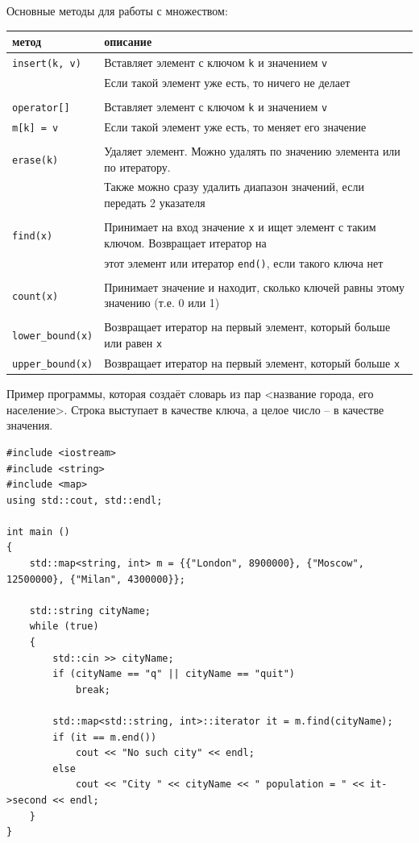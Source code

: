 \documentclass{article}
\begin{document}
Основные методы для работы с множеством:
\begin{center}
\begin{tabular}{ l | l }
 метод & описание \\ \hline
 \texttt{insert(k, v)}  & Вставляет элемент с ключом \texttt{k} и значением \texttt{v}\\
                        & Если такой элемент уже есть, то ничего не делает \\ \\\hline
 \texttt{operator[]}    &  Вставляет элемент с ключом \texttt{k} и значением \texttt{v}\\
 \texttt{m[k] = v}      & Если такой элемент уже есть, то меняет его значение \\ \\\hline
 \texttt{erase(k)}      & Удаляет элемент. Можно удалять по значению элемента или по итератору.  \\ 
                        & Также можно сразу удалить диапазон значений, если передать 2 указателя \\\\ \hline
 \texttt{find(x)}       & Принимает на вход значение \texttt{x} и ищет элемент с таким ключом. Возвращает итератор на \\
                        &  этот элемент или итератор \texttt{end()}, если такого ключа нет\\ \\ \hline
 \texttt{count(x)}      & Принимает значение и находит, сколько ключей равны этому значению (т.е. 0 или 1) \\ \\\hline
 \texttt{lower\_bound(x)}  & Возвращает итератор на первый элемент, который больше или равен \texttt{x} \\
 \texttt{upper\_bound(x)}  & Возвращает итератор на первый элемент, который больше \texttt{x} \\
\end{tabular}
\end{center}

Пример программы, которая создаёт словарь из пар <название города, его население>. Строка выступает в качестве ключа, а целое число -- в качестве значения.
\begin{lstlisting}
#include <iostream>
#include <string>
#include <map>
using std::cout, std::endl;

int main () 
{
    std::map<string, int> m = {{"London", 8900000}, {"Moscow", 12500000}, {"Milan", 4300000}};

    std::string cityName;
    while (true) 
    {
        std::cin >> cityName;
        if (cityName == "q" || cityName == "quit")
            break;
            
        std::map<std::string, int>::iterator it = m.find(cityName);
        if (it == m.end())
            cout << "No such city" << endl;
        else
            cout << "City " << cityName << " population = " << it->second << endl;
    }
}
\end{lstlisting}
\end{document}
